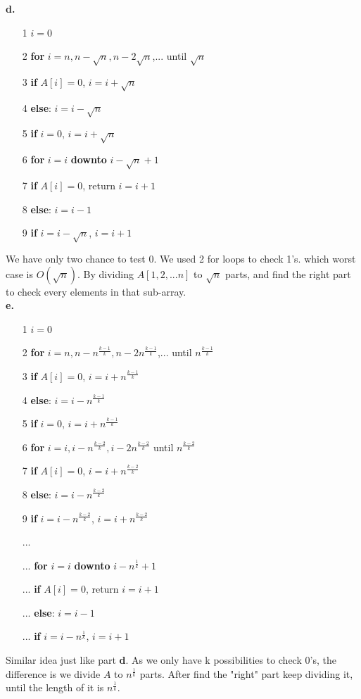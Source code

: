 \documentclass{article}
\theoremstyle{plain}
\begin{document}
\textbf{d.\\} 
\begin{enumerate}
    \item[1] $i = 0$
    \item[2] \textbf{for} $i = n, n - \sqrt{n}, n - 2\sqrt{n}$,... until $\sqrt{n}$
    \item[3] \quad \quad \textbf{if} $A[i] = 0$, $i = i + \sqrt{n}$
    \item[4] \quad \quad \textbf{else}: $i = i - \sqrt{n}$
    \item[5] \textbf{if} $i = 0$, $i = i + \sqrt{n}$
    \item[6] \textbf{for} $i = i$ \textbf{downto} $i - \sqrt{n} + 1$
    \item[7] \quad \quad \textbf{if} $A[i] = 0$, return $i = i + 1$
    \item[8] \quad \quad \textbf{else}: $i = i - 1$
    \item[9] \textbf{if} $i = i - \sqrt{n}$, $i = i + 1$
\end{enumerate}
We have only two chance to test 0. We used 2 for loops to check 1's. which worst case is $O(\sqrt{n})$. By dividing $A[1,2,...n]$ to $\sqrt{n}$ parts, and find the right part to check every elements in that sub-array.
\textbf{\\e.\\} 
\begin{enumerate}
    \item[1] $i = 0$
    \item[2] \textbf{for} $i = n, n - n^{\frac{k-1}{k}}, n - 2n^{\frac{k-1}{k}}$,... until $n^{\frac{k-1}{k}}$
    \item[3] \quad \quad \textbf{if} $A[i] = 0$, $i = i + n^{{\frac{k-1}{k}}}$
    \item[4] \quad \quad \textbf{else}: $i = i - n^{\frac{k-1}{k}}$
    \item[5] \textbf{if} $i = 0$, $i = i + n^{\frac{k-1}{k}}$
    \item[6] \textbf{for} $i = i, i - n^{\frac{k-2}{k}}, i - 2n^{\frac{k-2}{k}}$ until $n^{\frac{k-2}{k}}$
    \item[7] \quad \quad \textbf{if} $A[i] = 0$, $i = i + n^{{\frac{k-2}{k}}}$
    \item[8] \quad \quad \textbf{else}: $i = i - n^{{\frac{k-2}{k}}}$
    \item[9] \textbf{if} $i = i - n^{{\frac{k-2}{k}}}$, $i = i + n^{{\frac{k-2}{k}}}$
    \item[{}] ...
    \item[...] \textbf{for} $i = i$ \textbf{downto} $i - n^{\frac{1}{k}} + 1$
    \item[...] \quad \quad \textbf{if} $A[i] = 0$, return $i = i + 1$
    \item[...] \quad \quad \textbf{else}: $i = i - 1$
    \item[...] \textbf{if} $i = i - n^{\frac{1}{k}}$, $i = i + 1$
\end{enumerate}
Similar idea just like part \textbf{d}. As we only have k possibilities  to check 0's, the difference is we divide $A$ to $n^{\frac{1}{k}}$ parts. After find the "right" part keep dividing it, until the length of it is $n^{\frac{1}{k}}$.
\end{document}
